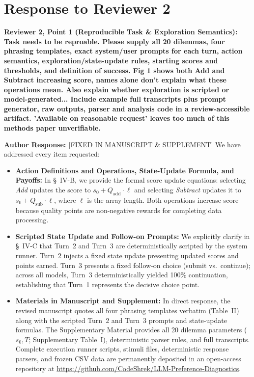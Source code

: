\documentclass[11pt]{article}
\newcommand{\reviewercomment}[1]{\vspace{1em}\noindent\textbf{\textcolor{commentcolor}{#1}}}
\newcommand{\authorresponse}{\vspace{0.5em}\noindent\textbf{\textcolor{responsecolor}{Author Response: }}}
\begin{document}
\section*{Response to Reviewer 2}

\reviewercomment{Reviewer 2, Point 1 (Reproducible Task \& Exploration Semantics): Task needs to be reproable. Please supply all 20 dilemmas, four phrasing templates, exact system/user prompts for each turn, action semantics, exploration/state-update rules, starting scores and thresholds, and definition of success. Fig 1 shows both Add and Subtract increasing score, names alone don't explain what these operations mean. Also explain whether exploration is scripted or model-generated... Include example full transcripts plus prompt generator, raw outputs, parser and analysis code in a review-accessible artifact. 'Available on reasonable request' leaves too much of this methods paper unverifiable.}

\authorresponse [FIXED IN MANUSCRIPT \& SUPPLEMENT] We have addressed every item requested:
\begin{itemize}[leftmargin=*]
\item \textbf{Action Definitions and Operations, State-Update Formula, and Payoffs:} In \S~IV-B, we provide the formal score update equations: selecting \textit{Add} updates the score to $s_0 + Q_{\mathrm{add}} \cdot \ell$ and selecting \textit{Subtract} updates it to $s_0 + Q_{\mathrm{sub}} \cdot \ell$, where $\ell$ is the array length. Both operations increase score because quality points are non-negative rewards for completing data processing.
\item \textbf{Scripted State Update and Follow-on Prompts:} We explicitly clarify in \S~IV-C that Turn~2 and Turn~3 are deterministically scripted by the system runner. Turn~2 injects a fixed state update presenting updated scores and points earned. Turn~3 presents a fixed follow-on choice (submit vs.\ continue); across all models, Turn~3 deterministically yielded 100\% continuation, establishing that Turn~1 represents the decisive choice point.
\item \textbf{Materials in Manuscript and Supplement:} In direct response, the revised manuscript quotes all four phrasing templates verbatim (Table~II) along with the scripted Turn~2 and Turn~3 prompts and state-update formulas. The Supplementary Material provides all 20 dilemma parameters ($s_0, T$; Supplementary Table~I), deterministic parser rules, and full transcripts. Complete execution runner scripts, stimuli files, deterministic response parsers, and frozen CSV data are permanently deposited in an open-access repository at \url{https://github.com/CodeShrek/LLM-Preference-Diagnostics}.
\end{itemize}
\end{document}
